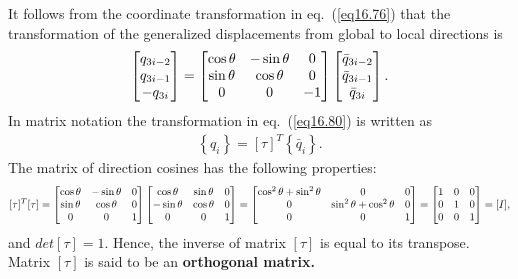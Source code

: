 \documentclass{AeroStructure-ERJohnson}
\begin{document}
It follows from the coordinate transformation in eq.~(\ref{eq16.76}) that the transformation of the generalized displacements from global to local directions is
\begin{align}\label{eq16.80}
\left[\begin{array}{@{}c@{}}q_{3 i-2} \\q_{3 i-1} \\-q_{3 i}\end{array}\right]=\left[\begin{array}{@{}ccc@{}}\cos \theta & -\sin \theta & 0 \\\sin \theta & \cos \theta & 0 \\0 & 0 & -1\end{array}\right]\left[\begin{array}{@{}c@{}}\bar{q}_{3i-2} \\\bar{q}_{3 i-1} \\\bar{q}_{3 i}\end{array}\right].
\end{align}
In matrix notation the transformation in eq.~(\ref{eq16.80}) is written as
\begin{align}\label{eq16.81}
\left\{q_{i}\right\}=[\tau]^{T}\left\{\bar{q}_{i}\right\}.
\end{align}
The matrix of direction cosines has the following properties:
\begin{align}\label{eq16.82}
[\tau]^{T}[\tau]=\left[\begin{array}{@{}ccc@{}}\cos \theta & -\sin \theta & 0 \\\sin \theta & \cos \theta & 0 \\0 & 0 & 1\end{array}\right]\left[\begin{array}{@{}ccc@{}}\cos \theta & \sin \theta & 0 \\-\sin \theta & \cos \theta & 0 \\0 & 0 & 1\end{array}\right]=\left[\begin{array}{@{}ccc@{}}\cos ^{2} \theta+\sin ^{2} \theta & 0 & 0 \\0 & \sin ^{2} \theta+\cos ^{2} \theta & 0 \\0 & 0 & 1\end{array}\right]=\left[\begin{array}{@{}lll@{}}1 & 0 & 0 \\0 & 1 & 0 \\0 & 0 & 1\end{array}\right]=[I],
\end{align}
and ${det}[\tau]=1$. Hence, the inverse of matrix $[\tau]$ is equal to its transpose. Matrix $[\tau]$ is said to be an \textbf{orthogonal matrix.}
\end{document}
